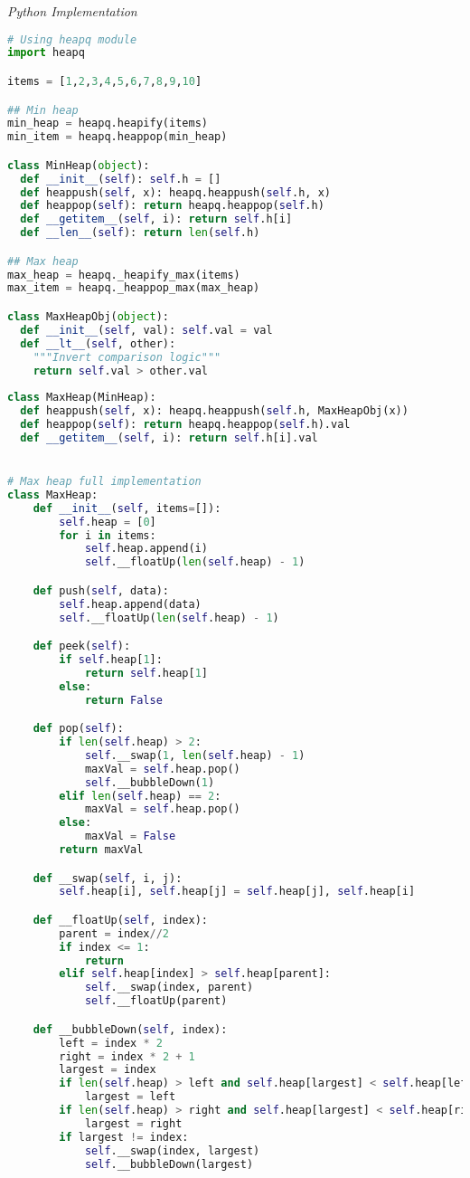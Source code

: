 \documentclass{article}
\begin{document}
\vspace{8pt} \emph{Python Implementation}
\begin{lstlisting}[language=Python]
# Using heapq module
import heapq

items = [1,2,3,4,5,6,7,8,9,10]    

## Min heap
min_heap = heapq.heapify(items)            
min_item = heapq.heappop(min_heap)      

class MinHeap(object):
  def __init__(self): self.h = []
  def heappush(self, x): heapq.heappush(self.h, x)
  def heappop(self): return heapq.heappop(self.h)
  def __getitem__(self, i): return self.h[i]
  def __len__(self): return len(self.h)

## Max heap
max_heap = heapq._heapify_max(items)       
max_item = heapq._heappop_max(max_heap) 

class MaxHeapObj(object):
  def __init__(self, val): self.val = val
  def __lt__(self, other): 
    """Invert comparison logic"""
    return self.val > other.val
  
class MaxHeap(MinHeap):
  def heappush(self, x): heapq.heappush(self.h, MaxHeapObj(x))
  def heappop(self): return heapq.heappop(self.h).val
  def __getitem__(self, i): return self.h[i].val


# Max heap full implementation
class MaxHeap:
    def __init__(self, items=[]):
        self.heap = [0]
        for i in items:
            self.heap.append(i)
            self.__floatUp(len(self.heap) - 1)

    def push(self, data):
        self.heap.append(data)
        self.__floatUp(len(self.heap) - 1)

    def peek(self):
        if self.heap[1]:
            return self.heap[1]
        else:
            return False

    def pop(self):
        if len(self.heap) > 2:
            self.__swap(1, len(self.heap) - 1)
            maxVal = self.heap.pop()
            self.__bubbleDown(1)
        elif len(self.heap) == 2:
            maxVal = self.heap.pop()
        else:
            maxVal = False
        return maxVal

    def __swap(self, i, j):
        self.heap[i], self.heap[j] = self.heap[j], self.heap[i]

    def __floatUp(self, index):
        parent = index//2
        if index <= 1:
            return
        elif self.heap[index] > self.heap[parent]:
            self.__swap(index, parent)
            self.__floatUp(parent)

    def __bubbleDown(self, index):
        left = index * 2
        right = index * 2 + 1
        largest = index
        if len(self.heap) > left and self.heap[largest] < self.heap[left]:
            largest = left
        if len(self.heap) > right and self.heap[largest] < self.heap[right]:
            largest = right
        if largest != index:
            self.__swap(index, largest)
            self.__bubbleDown(largest)

\end{lstlisting}
\end{document}
